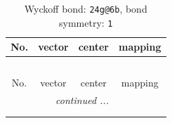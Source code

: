 \documentclass[fleqn,8pt]{jsarticle}
\begin{document}
\renewcommand{\arraystretch}{1.2}
\begin{longtable}{cccc}
\caption{Wyckoff bond: {\tt 24g@6b}, bond symmetry: {\tt 1}}
 \\
 \hline \hline
No. & vector & center & mapping \\ \hline \endfirsthead

\multicolumn{3}{l}{\tablename\ \thetable{}} \\
 \hline \hline
No. & vector & center & mapping \\ \hline \endhead

 \hline \hline
\multicolumn{3}{r}{\footnotesize\it continued ...} \\ \endfoot

 \hline \hline
\multicolumn{3}{r}{} \\ \endlastfoot


\end{longtable}
\end{document}
